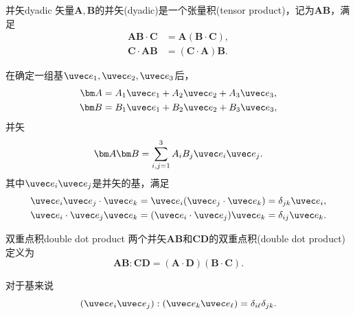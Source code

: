 \begin{definition}
    {并矢}{dyadic}
    矢量$\bm A,\bm B$的并矢(dyadic)是一个张量积(tensor product)，记为$\bm A\bm B$，满足
    \begin{subequations}
        \begin{align}
            \bm A\bm B\cdot\bm C&=\bm A(\bm B\cdot\bm C),\\
            \bm C\cdot\bm A\bm B&=(\bm C\cdot\bm A)\bm B.
        \end{align}
    \end{subequations}
\end{definition}

\begin{corollary}
    在确定一组基$\uvec e_1,\uvec e_2,\uvec e_3$后，
    \begin{align*}
        \bm A&=A_1\uvec e_1+A_2\uvec e_2+A_3\uvec e_3,\\
        \bm B&=B_1\uvec e_1+B_2\uvec e_2+B_3\uvec e_3,
    \end{align*}
    并矢
    \[
        \bm A\bm B=\sum_{i,j=1}^3 A_iB_j\uvec e_i\uvec e_j.
    \]
    其中$\uvec e_i\uvec e_j$是并矢的基，满足
    \begin{subequations}
        \begin{align}
            \uvec e_i\uvec e_j\cdot\uvec e_k&=\uvec e_i(\uvec e_j\cdot\uvec e_k)=\delta_{jk}\uvec e_i,\\
            \uvec e_i\cdot\uvec e_j\uvec e_k&=(\uvec e_i\cdot\uvec e_j)\uvec e_k=\delta_{ij}\uvec e_k.
        \end{align}
    \end{subequations}
\end{corollary}

\begin{definition}
    {双重点积}{double dot product}
    两个并矢$\bm A\bm B$和$\bm C\bm D$的双重点积(double dot product)定义为
    \begin{equation}
        \bm A\bm B:\bm C\bm D=(\bm A\cdot\bm D)(\bm B\cdot\bm C).
    \end{equation}
\end{definition}

\begin{corollary}
    对于基来说
    \begin{equation}
        (\uvec e_i\uvec e_j):(\uvec e_k\uvec e_\ell)=\delta_{i\ell}\delta_{jk}.
    \end{equation}
\end{corollary}

